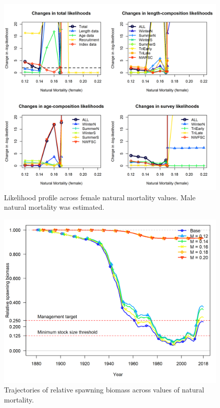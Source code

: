 \documentclass[12pt,]{article}
\begin{document}
\FloatBarrier

\begin{figure}
\centering
\includegraphics{Figures/piner_panel_m.png}
\caption{Likelihood profile across female natural mortality values. Male
natural mortality was estimated. \label{fig:m_like}}
\end{figure}

\FloatBarrier

\begin{figure}
\centering
\includegraphics{Figures/m_trajectories.png}
\caption{Trajectories of relative spawning biomass across values of
natural mortality. \label{fig:m_trajectory}}
\end{figure}
\end{document}
